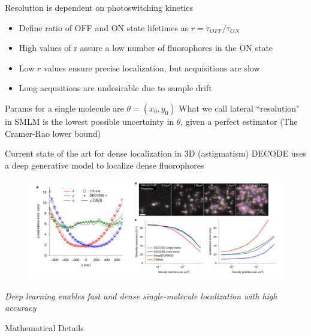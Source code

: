 \documentclass[aspectratio=169]{beamer}
\begin{document}
\begin{frame}{Resolution is dependent on photoswitching kinetics}

\begin{itemize}
\item Define ratio of OFF and ON state lifetimes as $r=\tau_{OFF} /\tau_{ON}$​
\item High values of r assure a low number of fluorophores in the ON state​
\item Low $r$ values ensure precise localization, but acquisitions are slow
\item Long acqusitions are undesirable due to sample drift
\end{itemize}
\vspace{0.2in}
Params for a single molecule are $\theta = (x_{0},y_{0})$
\vspace{0.1in}
What we call lateral ``resolution" in SMLM is the lowest possible uncertainty in $\theta$, given a perfect estimator (The Cramer-Rao lower bound)


\end{frame}

\begin{frame}{Current state of the art for dense localization in 3D (astigmatism)}
DECODE uses a deep generative model to localize dense fluorophores
\begin{figure}
\includegraphics[scale=0.33]{Figure-8}
\end{figure}
\textit{Deep learning enables fast and dense single-molecule localization with high accuracy}
\end{frame}



\begin{frame}[plain]
  \centering
  \Large Mathematical Details
\end{frame}
\end{document}
